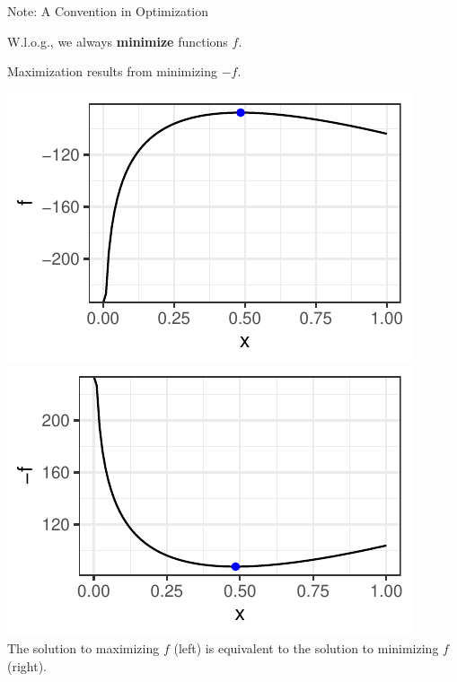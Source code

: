 \documentclass[11pt,compress,t,notes=noshow, xcolor=table]{beamer}
\begin{document}
\begin{vbframe}{Note: A Convention in Optimization}

W.l.o.g., we always \textbf{minimize} functions $f$. 

\lz

Maximization results from minimizing $-f$.

\begin{center}
	\begin{footnotesize}
	\includegraphics[height=0.3\textwidth, keepaspectratio]{figure_man/ml_poisson_example_2.pdf} \includegraphics[height=0.3\textwidth, keepaspectratio]{figure_man/ml_poisson_example_3.pdf} \\
	The solution to maximizing $f$ (left) is equivalent to the solution to minimizing $f$ (right). 
	\end{footnotesize}
\end{center}

\end{vbframe}
\end{document}
